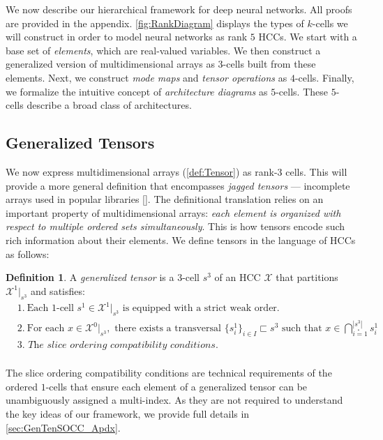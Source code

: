 \documentclass{article}
\theoremstyle{plain}
\theoremstyle{definition}
\newtheorem{definition}[theorem]{Definition}
\theoremstyle{remark}
\newcommand{\citenump}[1]{[\citenum{#1}]}
\begin{document}
We now describe our hierarchical framework for deep neural networks. All proofs are provided in the appendix. \cref{fig:RankDiagram} displays the types of $k$-cells we will construct in order to model neural networks as rank $5$ HCCs. We start with a base set of \textit{elements}, which are real-valued variables. We then construct a generalized version of multidimensional arrays as $3$-cells built from these elements. Next, we construct {\color{cyan}\textit{mode maps}} and {\color{purple}\textit{tensor operations}} as $4$-cells. Finally, we formalize the intuitive concept of {\color{orange}\textit{architecture diagrams}} as $5$-cells. These $5$-cells describe a broad class of architectures.


\subsection{Generalized Tensors}

We now express multidimensional arrays (\cref{def:Tensor}) as rank-$3$ cells. This will provide a more general definition that encompasses \textit{jagged tensors} --- incomplete arrays used in popular libraries \citenump{Pytorch, TensorFlow}. The definitional translation relies on an important property of multidimensional arrays: \textit{each element is organized with respect to multiple ordered sets simultaneously}. This is how tensors encode such rich information about their elements. We define tensors in the language of HCCs as follows:
\begin{definition}
	\label{def:GenTensor}
	A \textit{generalized tensor} is a $3$-cell $s^3$ of an HCC $\mathcal{X}$ that partitions $\mathcal{X}^1|_{s^3}$ and satisfies:
	\begingroup\setlength{\jot}{-1ex}
	\begin{equation*}
		\begin{aligned}
			&\textit{1.} \ \text{Each } 1\text{-cell } s^1 \in \mathcal{X}^1|_{s^3} \text{ is equipped with a strict weak order.}\\
			&\textit{2.} \ \text{For each } x \in \mathcal{X}^0|_{s^3}, \text{ there exists a transversal } \{s^1_i\}_{i\in I} \sqsubset s^3 \text{ such that } x \in \bigcap_{i=1}^{|s^3|} s^1_i\\
			&\textit{3. The slice ordering compatibility conditions.}\\
		\end{aligned}.
	\end{equation*}
	\endgroup
\end{definition}
The slice ordering compatibility conditions are technical requirements of the ordered $1$-cells that ensure each element of a generalized tensor can be unambiguously assigned a multi-index. As they are not required to understand the key ideas of our framework, we provide full details in \cref{sec:GenTenSOCC_Apdx}.
\end{document}
